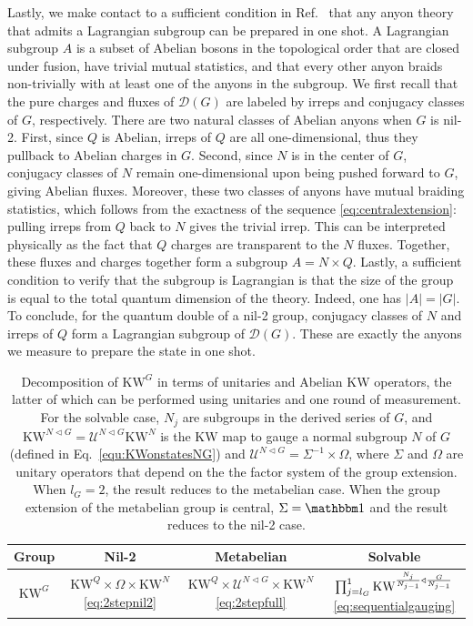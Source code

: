 \documentclass[nofootinbib,prx,twocolumn,showpacs,superscriptaddress,notitlepage,amsmath,amssymb]{revtex4-2}
\theoremstyle{definition}
\def\KW{\text{KW}}
\begin{document}
Lastly, we make contact to a sufficient condition in Ref.~ that any anyon theory that admits a Lagrangian subgroup can be prepared in one shot. A Lagrangian subgroup $A$ is a subset of Abelian bosons in the topological order that are closed under fusion, have trivial mutual statistics, and that every other anyon braids non-trivially with at least one of the anyons in the subgroup\cite{KS11,Levin13}. We first recall that the pure charges and fluxes of $\mathcal D(G)$ are labeled by irreps and conjugacy classes of $G$, respectively. There are two natural classes of Abelian anyons when $G$ is nil-2. First, since $Q$ is Abelian, irreps of $Q$ are all one-dimensional, thus they pullback to Abelian charges in $G$. Second, since $N$ is in the center of $G$, conjugacy classes of $N$ remain one-dimensional upon being pushed forward to $G$, giving Abelian fluxes. Moreover, these two classes of anyons have mutual braiding statistics, which follows from the exactness of the sequence \eqref{eq:centralextension}: pulling irreps from $Q$ back to $N$ gives the trivial irrep. This can be interpreted physically as the fact that $Q$ charges are transparent to the $N$ fluxes. Together, these fluxes and charges together form a subgroup $A=N\times Q$. Lastly, a sufficient condition to verify that the subgroup is Lagrangian is that the size of the group is equal to the total quantum dimension of the theory. Indeed, one has $|A| = |G|$. To conclude, for the quantum double of a nil-2 group, conjugacy classes of $N$ and irreps of $Q$ form a Lagrangian subgroup of $\mathcal D(G)$. These are exactly the anyons we measure to prepare the state in one shot.
\begin{table}[t!]
    \centering
    \begin{tabular}{|c|c|c|c|}
    \hline
    Group & Nil-2 & Metabelian & Solvable\\
    \hline
    $\KW^G$ & $\KW^Q \times   \Omega \times  \KW^N$ \eqref{eq:2stepnil2}    & $\KW^Q \times \mathcal U^{N \triangleleft G}\times  \KW^N $  \eqref{eq:2stepfull}
         & $\prod_{j=l_G}^{1} \KW^{{N_{j}\over N_{j-1}}\triangleleft{ G\over N_{j-1}}}$ \eqref{eq:sequentialgauging}\\
         \hline
    \end{tabular}
    \caption{Decomposition of $\KW^G$ in terms of unitaries and Abelian KW operators, the latter of which can be performed using unitaries and one round of measurement. For the solvable case, $N_j$ are subgroups in the derived series of $G$, and $\KW^{N \triangleleft G} = \mathcal U^{N \triangleleft G} \KW^N$ is the KW map to gauge a normal subgroup $N$ of $G$ (defined in Eq.~\eqref{equ:KWonstatesNG}) and $\mathcal U^{N \triangleleft G} = \Sigma^{-1} \times \Omega$, where $\Sigma$ and $\Omega$ are unitary operators that depend on the the factor system of the group extension. When $l_G=2$, the result reduces to the metabelian case. When the group extension of the metabelian group is central, $\Sigma = \mathbbm 1$ and the result reduces to the nil-2 case.}
    \label{tab:KWsummary}
\end{table}
\end{document}
